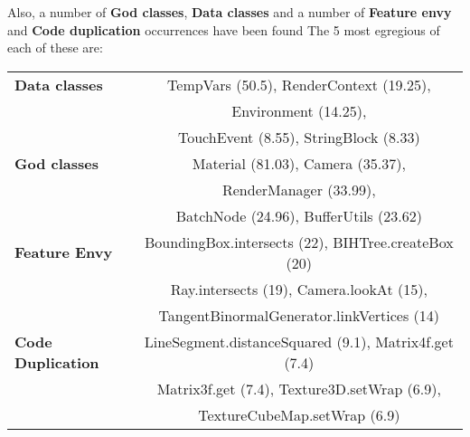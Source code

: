\documentclass[a4paper, 10pt]{article}
\begin{document}

Also, a number of \textbf{God classes}, %
\textbf{Data classes} and a number of \textbf{Feature envy} and
\textbf{Code duplication} occurrences have been found
The 5 most egregious of each of these are:

\begin{tabular}{| l || c |}
  \hline
  \textbf{Data classes}     & TempVars (50.5), RenderContext (19.25), \\
                            & Environment (14.25), \\
                            & TouchEvent (8.55), StringBlock (8.33) \\
  \hline
  \textbf{God classes}      & Material (81.03), Camera (35.37), \\
                            & RenderManager (33.99), \\
                            & BatchNode (24.96), BufferUtils (23.62) \\
  \hline
  \textbf{Feature Envy}     & BoundingBox.intersects (22), BIHTree.createBox (20) \\
                            & Ray.intersects (19), Camera.lookAt (15), \\
                            & TangentBinormalGenerator.linkVertices (14) \\
  \hline
  \textbf{Code Duplication} & LineSegment.distanceSquared (9.1), Matrix4f.get (7.4) \\
                            & Matrix3f.get (7.4), Texture3D.setWrap (6.9), \\
                            & TextureCubeMap.setWrap (6.9) \\
  \hline
\end{tabular}

\end{document}
